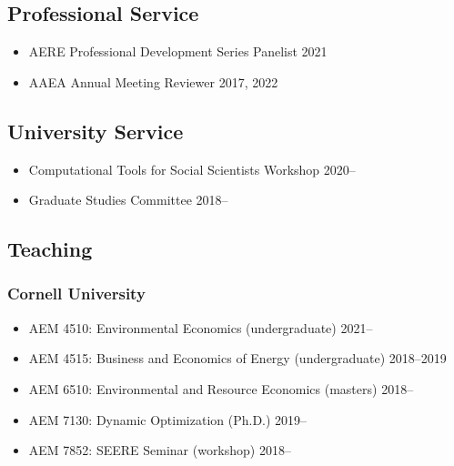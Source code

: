 \documentclass[11pt]{res} %
\begin{document}
\begin{resume}
\vspace{-.2in}

\subsection{Professional Service}
\begin{itemize} \itemsep -1pt
	\item[]	AERE Professional Development Series Panelist \hfill 2021
	\item[] AAEA Annual Meeting Reviewer \hfill 2017, 2022
\end{itemize}


\vspace{-.2in}

\subsection{University Service}
\begin{itemize} \itemsep -1pt
	\item[] Computational Tools for Social Scientists Workshop \hfill 2020--
	\item[]	Graduate Studies Committee \hfill 2018--
\end{itemize}

\vspace{-.2in}

\subsection{Teaching}\vspace{-.2in}
\subsubsection{Cornell University}
\begin{itemize} \itemsep -1pt
	\item[] AEM 4510: Environmental Economics (undergraduate) \hfill 2021--
	\item[] AEM 4515: Business and Economics of Energy (undergraduate) \hfill 2018--2019
	\item[] AEM 6510: Environmental and Resource Economics (masters) \hfill 2018--
	\item[] AEM 7130: Dynamic Optimization (Ph.D.) \hfill 2019--
	\item[] AEM 7852: SEERE Seminar (workshop) \hfill 2018--
\end{itemize}\vspace{-.3in}

\end{resume}
\end{document}
